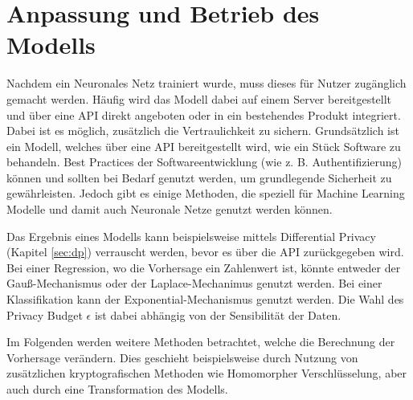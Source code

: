 \section{Anpassung und Betrieb des Modells}\label{sec:betrieb}

Nachdem ein Neuronales Netz trainiert wurde, muss dieses für Nutzer zugänglich gemacht werden.
Häufig wird das Modell dabei auf einem Server bereitgestellt und über eine API direkt angeboten oder in ein bestehendes Produkt integriert.
Dabei ist es möglich, zusätzlich die Vertraulichkeit zu sichern.
Grundsätzlich ist ein Modell, welches über eine API bereitgestellt wird, wie ein Stück Software zu behandeln. 
Best Practices der Softwareentwicklung (wie z. B. Authentifizierung) können und sollten bei Bedarf genutzt werden, um grundlegende Sicherheit zu gewährleisten.
Jedoch gibt es einige Methoden, die speziell für Machine Learning Modelle und damit auch Neuronale Netze genutzt werden können.

Das Ergebnis eines Modells kann beispielsweise mittels Differential Privacy (Kapitel \ref{sec:dp}) verrauscht werden, bevor es über die API zurückgegeben wird. 
Bei einer Regression, wo die Vorhersage ein Zahlenwert ist, könnte entweder der Gauß-Mechanismus oder der Laplace-Mechanimus genutzt werden. 
Bei einer Klassifikation kann der Exponential-Mechanismus genutzt werden.
Die Wahl des Privacy Budget $\epsilon$ ist dabei abhängig von der Sensibilität der Daten.

Im Folgenden werden weitere Methoden betrachtet, welche die Berechnung der Vorhersage verändern.
Dies geschieht beispielsweise durch Nutzung von zusätzlichen kryptografischen Methoden wie Homomorpher Verschlüsselung, aber auch durch eine Transformation des Modells.





